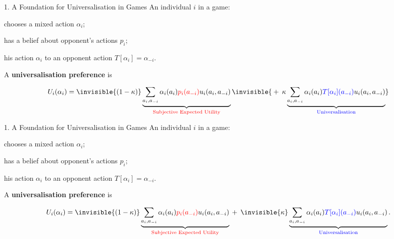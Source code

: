 \documentclass[usenames,dvipsnames,aspectratio=169,11pt,handout]{beamer}
\begin{document}
\begin{frame}{1. A Foundation for Universalisation in Games}
	An individual \( i \) in a game:

	\vfill

	\begin{wideitemize}
		\item chooses a mixed action \( \alpha_i \);
		\item has a belief about opponent's actions \( p_i \);
		\item {} his action \( \alpha_i \) to an opponent action \( T [\alpha_{i} ] = \alpha_{-i} \).
	\end{wideitemize}

	\vfill

	A \textbf{universalisation preference} is

	\vfill

	\[
		\begin{aligned}
			U_i(\alpha_i) = \invisible{(1-\kappa)} \underbrace{\sum_{a_i, a_{-i}} \alpha_i(a_i) \textcolor{red}{p_{i}(a_{-i})} u_i(a_i, a_{-i})}_{\text{\textcolor{red}{Subjective Expected Utility}}} \invisible{\: + \: \: \kappa \underbrace{\sum_{a_i, a_{-i}} \alpha_i(a_i) \textcolor{blue}{T [ \alpha_i ](a_{-i})} u_i(a_i, a_{-i})}_{\text{\textcolor{blue}{Universalisation}}}}
		\end{aligned}
	\]

\end{frame}

\begin{frame}[noframenumbering]{1. A Foundation for Universalisation in Games}
	An individual \( i \) in a game:

	\vfill

	\begin{wideitemize}
		\item chooses a mixed action \( \alpha_i \);
		\item has a belief about opponent's actions \( p_i \);
		\item {} his action \( \alpha_i \) to an opponent action \( T [\alpha_{i} ] = \alpha_{-i} \).
	\end{wideitemize}

	\vfill

	A \textbf{universalisation preference} is

	\vfill

	\[
		\begin{aligned}
			U_i(\alpha_i) = \invisible{(1-\kappa)} \underbrace{\sum_{a_i, a_{-i}} \alpha_i(a_i) \textcolor{red}{p_{i}(a_{-i})} u_i(a_i, a_{-i})}_{\text{\textcolor{red}{Subjective Expected Utility}}} \: + \: \: \invisible{\kappa} \underbrace{\sum_{a_i, a_{-i}} \alpha_i(a_i) \textcolor{blue}{T [ \alpha_i ](a_{-i})} u_i(a_i, a_{-i})}_{\text{\textcolor{blue}{Universalisation}}} .
		\end{aligned}
	\]

\end{frame}
\end{document}
